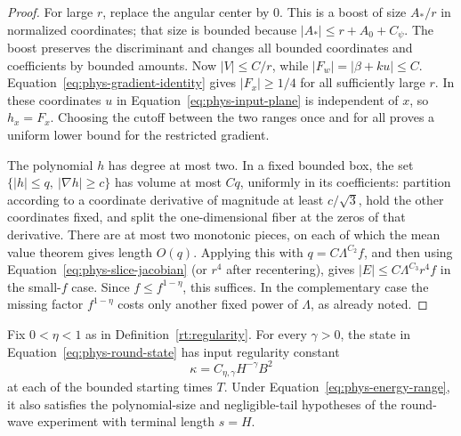 \begin{proof}
For large $r$, replace the angular center by $0$.  This is a boost
of size $A_*/r$ in normalized coordinates; that size is bounded
because $|A_*|\le r+A_0+C_\psi$.  The boost preserves the discriminant
and changes all bounded coordinates and coefficients by bounded
amounts.  Now $|V|\le C/r$, while $|F_w|=|\beta+ku|\le C$.
Equation~\eqref{eq:phys-gradient-identity} gives $|F_x|\ge1/4$ for
all sufficiently large $r$.  In these coordinates $u$ in
Equation~\eqref{eq:phys-input-plane} is independent of $x$, so
$h_x=F_x$.  Choosing the cutoff between the two ranges once and for
all proves a uniform lower bound for the restricted gradient.

The polynomial $h$ has degree at most two.  In a fixed bounded
box, the set
$\{|h|\le q,\ |\nabla h|\ge c\}$ has volume at most $Cq$,
uniformly in its coefficients: partition according to a coordinate
derivative of magnitude at least $c/\sqrt3$, hold the other
coordinates fixed, and split the one-dimensional fiber at the
zeros of that derivative.  There are at most two monotonic pieces,
on each of which the mean value theorem gives length $O(q)$.
Applying this with $q=C\Lambda^{C_2}f$, and then using
Equation~\eqref{eq:phys-slice-jacobian} (or $r^4$ after recentering),
gives $|E|\le C\Lambda^{C_3}r^4f$ in the small-$f$ case.
Since $f\le f^{1-\eta}$, this suffices.  In the complementary
case the missing factor $f^{1-\eta}$ costs only another fixed power
of $\Lambda$, as already noted.
\end{proof}

\begin{proposition}
\label{prop:phys-input-regularity}
Fix $0<\eta<1$ as in Definition~\ref{rt:regularity}. For every
$\gamma>0$, the state in
Equation~\eqref{eq:phys-round-state} has input regularity constant
\begin{equation}
 \kappa=C_{\eta,\gamma}H^{-\gamma}B^2
 \label{eq:phys-kappa}
\end{equation}
at each of the bounded starting times $T$.  Under
Equation~\eqref{eq:phys-energy-range}, it also satisfies the
polynomial-size and negligible-tail hypotheses of the round-wave
experiment with terminal length $s=H$.
\end{proposition}

